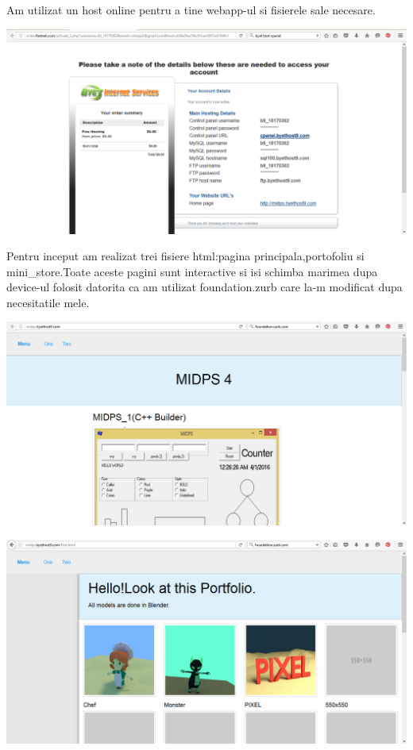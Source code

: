 Am utilizat un host online pentru a tine webapp-ul si fisierele sale necesare.
\begin{center}
\includegraphics[scale=0.5]{images/host}
\end{center}
Pentru inceput am realizat trei fisiere html:pagina principala,portofoliu si mini\_store.Toate aceste pagini sunt interactive si isi schimba marimea dupa device-ul folosit datorita ca am utilizat foundation.zurb care la-m modificat dupa necesitatile mele.
\begin{flushleft}
\includegraphics[scale=0.5]{images/home}
\end{flushleft}
\begin{flushleft}
\includegraphics[scale=0.5]{images/portfolio}
\end{flushleft}
